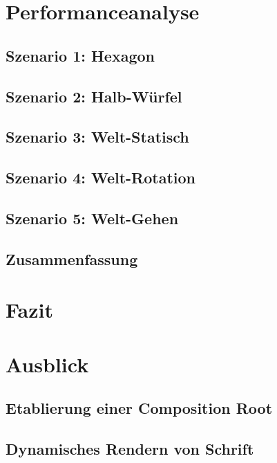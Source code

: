 \documentclass[12pt,a4paper,listof=toc,parskip=half,numbers=noenddot,abstract=true]{scrartcl}
\begin{document}
\clearpage
\section{Performanceanalyse}

\subsection{Szenario 1: Hexagon}

\subsection{Szenario 2: Halb-Würfel}

\subsection{Szenario 3: Welt-Statisch}

\subsection{Szenario 4: Welt-Rotation}

\subsection{Szenario 5: Welt-Gehen}

\subsection{Zusammenfassung}


\pagebreak
\section{Fazit}
\pagebreak
\section{Ausblick}
\subsection{Etablierung einer Composition Root}\label{sec:EtablierungEinerKompositionroot}

\subsection{Dynamisches Rendern von Schrift}
\end{document}
